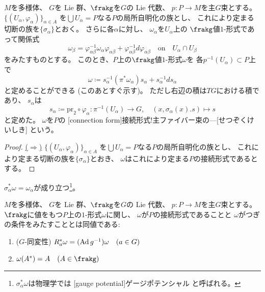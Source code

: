 \documentclass[report]{jlreq}
\begin{document}
\begin{definition}[主ファイバー束の接続形式]
    $M$を多様体、
    $G$を Lie 群、$\frakg$を$G$の Lie 代数、
    $p \colon P \to M$を主$G$束とする。
    $\{ (U_\alpha, \varphi_\alpha) \}_{\alpha \in A}$
    を$\bigcup U_\alpha = P$なる$P$の局所自明化の族とし、
    これにより定まる切断の族を$\{ \sigma_\alpha \}$とおく。
    さらに各$\alpha$に対し、
    $\omega_\alpha$を$U_\alpha$上の
    $\frakg$値$1$-形式であって関係式
    \begin{equation}
        \omega_\beta = \varphi_{\alpha\beta}^{-1} \omega_\alpha \varphi_{\alpha\beta}
            + \varphi_{\alpha\beta}^{-1} d\varphi_{\alpha\beta}
            \quad \text{on} \quad
            U_\alpha \cap U_\beta
    \end{equation}
    をみたすものとする。
    このとき、$P$上の$\frakg$値$1$-形式$\omega$を
    各$p^{-1}(U_\alpha) \subset P$上で
    \begin{equation}
        \omega \coloneqq
            s_\alpha^{-1} (\pi^* \omega_\alpha) s_\alpha
            + s_{\alpha}^{-1} ds_\alpha
    \end{equation}
    と定めることができる (このあとすぐ示す)。
    ただし右辺の積は$TG$における積であり、
    $s_\alpha$は
    \begin{equation}
        s_\alpha \coloneqq \mathrm{pr}_2 \circ \varphi_\alpha
        \colon \pi^{-1}(U_\alpha) \to G,
        \quad
        (x, \sigma_\alpha(x) . s) \mapsto s
    \end{equation}
    と定めた。
    $\omega$を$P$の
    [connection form]{接続形式!主ファイバー束の---}[せつぞくけいしき]
    という。
\end{definition}

\begin{proof}
    \uline{($\Rightarrow$)} \quad
    $\{ (U_\alpha, \varphi_\alpha) \}_{\alpha \in A}$
    を$\bigcup U_\alpha = P$なる$P$の局所自明化の族とし、
    これにより定まる切断の族を$\{ \sigma_\alpha \}$とおき、
    $\omega$はこれにより定まる$P$の接続形式であるとする。
    \TODO{}
\end{proof}

\begin{remark}
    $\sigma_\alpha^* \omega = \omega_\alpha$が成り立つ\footnote{
        $\sigma_\alpha^* \omega$は物理学では
        [gauge potential]{ゲージポテンシャル}
        と呼ばれる。
    }。
    \TODO{}
\end{remark}

\begin{theorem}[主ファイバー束の接続形式の特徴付け]
    $M$を多様体、
    $G$を Lie 群、$\frakg$を$G$の Lie 代数、
    $p \colon P \to M$を主$G$束とする。
    $\frakg$に値をもつ$P$上の$1$-形式$\omega$に関し、
    $\omega$が$P$の接続形式であることと
    $\omega$がつぎの条件をみたすこととは同値である:
    \begin{enumerate}
        \item ($G$-同変性) $R_a^* \omega = (\operatorname{Ad} g^{-1}) \omega \quad (a \in G)$
        \item $\omega(A^*) = A \quad (A \in \frakg)$
    \end{enumerate}
\end{theorem}
\end{document}
